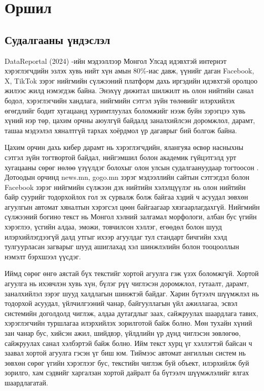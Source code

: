 ﻿%

\chapter{Оршил}
\label{Chapter1}

\section{Судалгааны үндэслэл}

DataReportal (2024) \cite{datareportal2024}-ийн мэдээллээр Монгол Улсад
идэвхтэй интернэт хэрэглэгчдийн эзлэх хувь нийт хүн амын 80\%-иас давж,
үүнийг даган Facebook, X, TikTok зэрэг нийгмийн сүлжээний платформ дахь
иргэдийн идэвхтэй оролцоо жилээс жилд нэмэгдэж байна. Энэхүү дижитал шилжилт
нь олон нийтийн санал бодол, хэрэглэгчийн хандлага, нийгмийн сэтгэл зүйн
төлөвийг илэрхийлэх өгөгдлийг бодит хугацаанд хуримтлуулах боломжийг нээж
буйн зэрэгцээ хувь хүний нэр төр, цахим орчны аюулгүй байдалд заналхийлсэн
доромжлол, дарамт, ташаа мэдээлэл хяналтгүй тархах хоёрдмол үр дагаврыг бий
болгож байна.

Цахим орчин дахь кибер дарамт нь хэрэглэгчдийн, ялангуяа өсвөр насныхны
сэтгэл зүйн тогтвортой байдал, нийгэмшил болон академик гүйцэтгэлд урт
хугацааны сөрөг нөлөө үзүүлдэг болохыг олон улсын судалгаануудаар тогтоосон
\cite{kowalski2014,vogels2022}. Дотоодын орчинд news.mn, gogo.mn зэрэг
мэдээллийн сайтын сэтгэгдэл болон Facebook зэрэг нийгмийн сүлжээн дэх
нийтийн хэлэлцүүлэг нь олон нийтийн байр суурийг тодорхойлох гол эх сурвалж
болж байгаа хэдий ч асуудал зөвхөн агуулгын автомат хяналтын хэрэгсэл цөөн
байгаагаар хязгаарлагдахгүй. Нийгмийн сүлжээний богино текст нь Монгол хэлний
залгамал морфологи, албан бус үгийн хэрэглээ, үсгийн алдаа, эможи, товчилсон
хэллэг, егөөдөл болон шууд илэрхийлэгдээгүй далд утгыг ихээр агуулдаг тул
стандарт бичгийн хэлд тулгуурласан загварыг шууд ашиглахад хэл шинжлэлийн
болон тооцооллын нэмэлт бэрхшээл үүсдэг.

Иймд сөрөг өнгө аястай бүх текстийг хортой агуулга гэж үзэх боломжгүй.
Хортой агуулга нь ихэвчлэн хувь хүн, бүлэг рүү чиглэсэн доромжлол, гутаалт,
дарамт, заналхийлэл зэрэг шууд халдлагын шинжтэй байдаг. Харин бүтээлч
шүүмжлэл нь тодорхой асуудал, үйлчилгээний чанар, байгууллагын үйл ажиллагаа,
эсвэл системийн доголдолд чиглэж, алдаа дутагдлыг заах, сайжруулах шаардлага
тавих, хэрэглэгчийн туршлагаа илэрхийлэх зорилготой байж болно. Мөн тухайн
хүний зан чанар бус, хийсэн ажил, шийдвэр, үйлдлийн үр дүнд чиглэсэн зөвлөгөө,
сайжруулах санал хэлбэртэй байж болно.
Ийм текст хурц үг хэллэгтэй байсан ч заавал хортой агуулга гэсэн үг биш юм.
Тиймээс автомат ангиллын систем нь зөвхөн сөрөг үгийн хэрэглээг бус, текстийн
чиглэж буй объект, илэрхийлж буй зорилго, хам сэдвийг харгалзан хортой дайралт
ба бүтээлч шүүмжлэлийг ялгах шаардлагатай.

